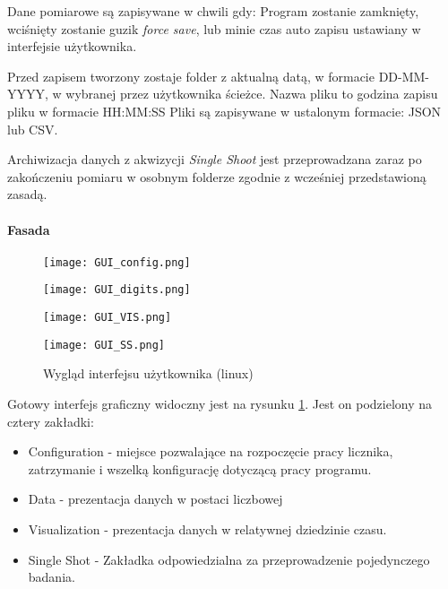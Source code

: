 Dane pomiarowe są zapisywane w chwili gdy: Program zostanie zamknięty, wciśnięty zostanie guzik \textit{force save}, lub minie czas auto zapisu ustawiany w interfejsie użytkownika. 

Przed zapisem tworzony zostaje folder z aktualną datą, w formacie DD-MM-YYYY, w wybranej przez użytkownika ścieżce. Nazwa pliku to godzina zapisu pliku w formacie HH:MM:SS
Pliki są zapisywane w ustalonym formacie: JSON lub CSV.

Archiwizacja danych z akwizycji \textit{Single Shoot} jest przeprowadzana zaraz po zakończeniu pomiaru w osobnym folderze zgodnie z wcześniej przedstawioną zasadą. 

\paragraph{Fasada}
\begin{figure}
        \begin{multicols}{2}
        
        \texttt{[image: GUI\_config.png]}\par
        
        
        \texttt{[image: GUI\_digits.png]}\par
        
        
        \end{multicols}\hfill
        
        \begin{multicols}{2}
        
        
        \texttt{[image: GUI\_VIS.png]}\par
        
        
        \texttt{[image: GUI\_SS.png]}\par
        
        \end{multicols}
        \caption{Wygląd interfejsu użytkownika (linux)}
        \label{Gui pic}
        \end{figure}

Gotowy interfejs graficzny widoczny jest na rysunku \ref{Gui pic}. Jest on podzielony na cztery zakładki:
\begin{itemize}
        \item Configuration - miejsce pozwalające na rozpoczęcie pracy licznika, zatrzymanie i wszelką konfigurację dotyczącą pracy programu. 
        \item Data - prezentacja danych w postaci liczbowej 
        \item Visualization - prezentacja danych w relatywnej dziedzinie czasu. 
        \item Single Shot - Zakładka odpowiedzialna za przeprowadzenie pojedynczego badania.
\end{itemize}

